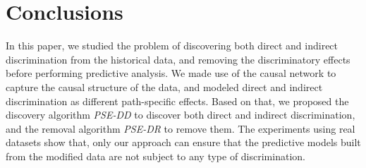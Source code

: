\documentclass[letterpaper]{article}
\begin{document}
\section{Conclusions}
In this paper, we studied the problem of discovering both direct and indirect discrimination from the historical data, and removing the discriminatory effects before performing predictive analysis. We made use of the causal network to capture the causal structure of the data, and modeled direct and indirect discrimination as different path-specific effects. Based on that, we proposed the discovery algorithm \emph{PSE-DD} to discover both direct and indirect discrimination, and the removal algorithm \emph{PSE-DR} to remove them. The experiments using real datasets show that, only our approach can ensure that the predictive models built from the modified data are not subject to any type of discrimination.




\end{document}
